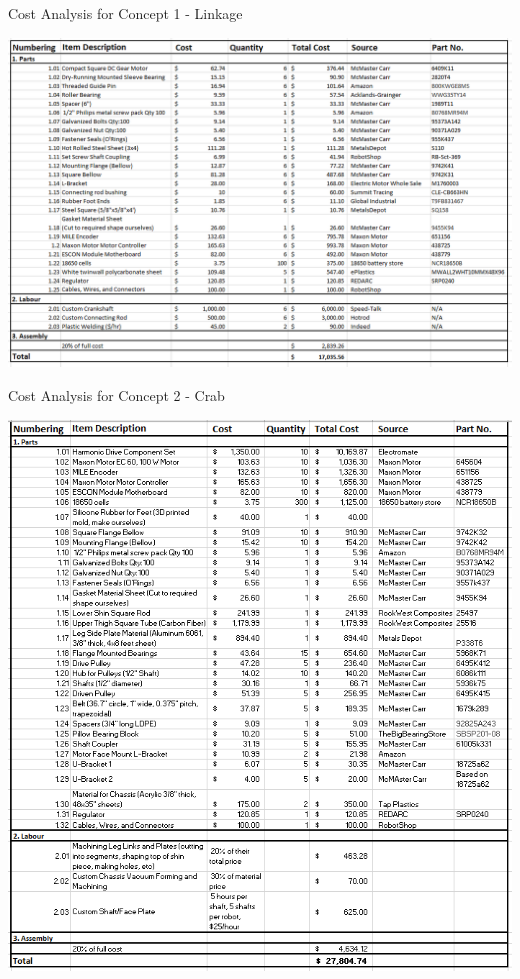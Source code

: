 \begin{table}[H]
    \centering
  \caption{Cost Analysis for Concept 1 - Linkage}
  \label{table:cost_linkage}
  \includegraphics[width=0.9\linewidth]{Cost/C1.PNG}
\end{table}

\begin{table}[H]
  \caption{Cost Analysis for Concept 2 - Crab}
  \label{table:cost_crab}
  \includegraphics[width=\linewidth]{Cost/C2.PNG}
\end{table}

